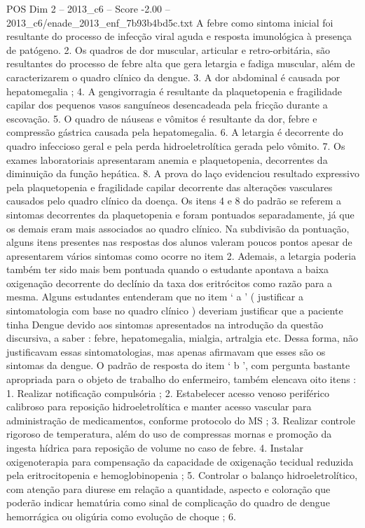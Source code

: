 \begin{textsample}{POS Dim 2 – 2013\_c6 – Score -2.00 – 2013\_c6/enade\_2013\_enf\_7b93b4bd5c.txt}
A febre como sintoma inicial foi resultante do processo de infecção viral aguda e resposta imunológica à presença de patógeno. 2.
Os quadros de dor muscular, articular e retro-orbitária, são resultantes do processo de febre alta que gera letargia e fadiga muscular, além de caracterizarem o quadro clínico da dengue. 3.
A dor abdominal é causada por hepatomegalia ; 4.
A gengivorragia é resultante da plaquetopenia e fragilidade capilar dos pequenos vasos sanguíneos desencadeada pela fricção durante a escovação. 5.
O quadro de náuseas e vômitos é resultante da dor, febre e compressão gástrica causada pela hepatomegalia. 6.
A letargia é decorrente do quadro infeccioso geral e pela perda hidroeletrolítica gerada pelo vômito. 7.
Os exames laboratoriais apresentaram anemia e plaquetopenia, decorrentes da diminuição da função hepática. 8.
A prova do laço evidenciou resultado expressivo pela plaquetopenia e fragilidade capilar decorrente das alterações vasculares causados pelo quadro clínico da doença.
Os itens 4 e 8 do padrão se referem a sintomas decorrentes da plaquetopenia e foram pontuados separadamente, já que os demais eram mais associados ao quadro clínico.
Na subdivisão da pontuação, alguns itens presentes nas respostas dos alunos valeram poucos pontos apesar de apresentarem vários sintomas como ocorre no item 2.
Ademais, a letargia poderia também ter sido mais bem pontuada quando o estudante apontava a baixa oxigenação decorrente do declínio da taxa dos eritrócitos como razão para a mesma.
Alguns estudantes entenderam que no item ‘ a ’ ( justificar a sintomatologia com base no quadro clínico ) deveriam justificar que a paciente tinha Dengue devido aos sintomas apresentados na introdução da questão discursiva, a saber : febre, hepatomegalia, mialgia, artralgia etc.
Dessa forma, não justificavam essas sintomatologias, mas apenas afirmavam que esses são os sintomas da dengue.
O padrão de resposta do item ‘ b ’, com pergunta bastante apropriada para o objeto de trabalho do enfermeiro, também elencava oito itens : 1.
Realizar notificação compulsória ; 2.
Estabelecer acesso venoso periférico calibroso para reposição hidroeletrolítica e manter acesso vascular para administração de medicamentos, conforme protocolo do MS ; 3.
Realizar controle rigoroso de temperatura, além do uso de compressas mornas e promoção da ingesta hídrica para reposição de volume no caso de febre. 4.
Instalar oxigenoterapia para compensação da capacidade de oxigenação tecidual reduzida pela eritrocitopenia e hemoglobinopenia ; 5.
Controlar o balanço hidroeletrolítico, com atenção para diurese em relação a quantidade, aspecto e coloração que poderão indicar hematúria como sinal de complicação do quadro de dengue hemorrágica ou oligúria como evolução de choque ; 6.

\end{textsample}
